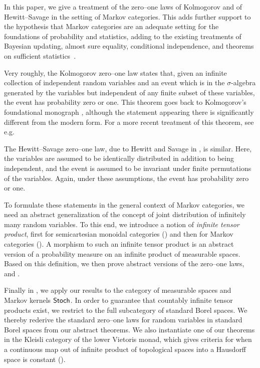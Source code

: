 \documentclass[11pt]{article}
\begin{document}
In this paper, we give a treatment of the zero--one laws of Kolmogorov and of Hewitt--Savage in the setting of Markov categories. This adds further support to the hypothesis that Markov categories are an adequate setting for the foundations of probability and statistics, adding to the existing treatments of Bayesian updating, almost sure equality, conditional independence, and theorems on sufficient statistics~\cite{cho_jacobs,markov_cats}.

Very roughly, the Kolmogorov zero--one law states that, given an infinite collection of independent random variables and an event which is in the $\sigma$-algebra generated by the variables but independent of any finite subset of these variables, the event has probability zero or one.
This theorem goes back to Kolmogorov's foundational monograph \cite{kolmogorovgerm}, although the statement appearing there is significantly different from the modern form.
For a more recent treatment of this theorem, see e.g. \cite[Theorem~2.37]{klenke}


The Hewitt--Savage zero--one law, due to Hewitt and Savage in \cite[Theorem~11.3]{hewitt_savage}, is similar. Here, the variables are assumed to be identically distributed in addition to being independent, and the event is assumed to be invariant under finite permutations of the variables. Again, under these assumptions, the event has probability zero or one.

To formulate these statements in the general context of Markov categories, we need an abstract generalization of the concept of joint distribution of infinitely many random variables.
To this end, we introduce a notion of \emph{infinite tensor product}, first for semicartesian monoidal categories () and then for Markov categories (). A morphism to such an infinite tensor product is an abstract version of a probability measure on an infinite product of measurable spaces. Based on this definition, we then prove abstract versions of the zero--one laws,  and .

Finally in , we apply our results to the category of measurable spaces and Markov kernels $\operatorname{\mathsf{Stoch}}$. In order to guarantee that countably infinite tensor products exist, we restrict to the full subcategory of standard Borel spaces. We thereby rederive the standard zero--one laws for random variables in standard Borel spaces from our abstract theorems. We also instantiate one of our theorems in the Kleisli category of the lower Vietoris monad, which gives criteria for when a continuous map out of infinite product of topological spaces into a Hausdorff space is constant ().
\end{document}
